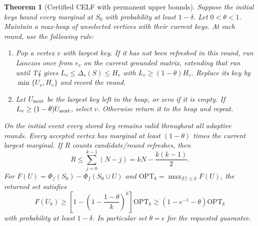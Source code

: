 \documentclass[11pt]{article}
\newtheorem{theorem}{Theorem}
\begin{document}
\begin{theorem}[Certified CELF with permanent upper bounds]\label{thm:celf}
Suppose the initial keys bound every marginal at $S_0$ with
probability at least $1-\delta$. Let $0<\theta<1$.
Maintain a max-heap of unselected vertices with their current keys.
At each round, use the following rule:
\begin{enumerate}
\item Pop a vertex $v$ with largest key. If it has not been refreshed
in this round, run Lanczos once from $e_v$ on the current grounded
matrix, extending that run until T4 gives
$L_v\leq\Delta_v(S)\leq H_v$ with $L_v\geq(1-\theta)H_v$.
Replace its key by $\min\{U_v,H_v\}$ and record the round.
\item Let $U_{\rm next}$ be the largest key left in the heap, or
zero if it is empty. If $L_v\geq(1-\theta)U_{\rm next}$, select
$v$. Otherwise return it to the heap and repeat.
\end{enumerate}
On the initial event every stored key remains valid throughout all
adaptive rounds. Every accepted vertex has marginal at least
$(1-\theta)$ times the current largest marginal. If $R$ counts
candidate/round refreshes, then
\begin{equation}\label{eq:Rbound}
 R\leq\sum_{j=0}^{k-1}(N-j)=kN-\frac{k(k-1)}2.
\end{equation}
For $F(U)=\Phi_f(S_0)-\Phi_f(S_0\cup U)$ and
$\mathrm{OPT}_k=\max_{|U|\leq k}F(U)$, the returned set satisfies
\begin{equation}\label{eq:lazyguarantee}
 F(U_k)\geq\left[1-\left(1-\frac{1-\theta}{k}\right)^k\right]
                  \mathrm{OPT}_k
 \geq(1-e^{-1}-\theta)\mathrm{OPT}_k
\end{equation}
with probability at least $1-\delta$. In particular set
$\theta=\epsilon$ for the requested guarantee.
\end{theorem}
\end{document}
